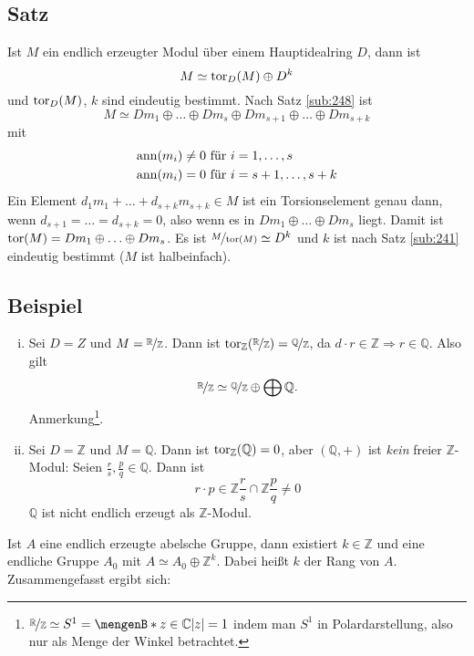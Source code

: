 \subsection[Satz: Zerlegung eines endlich erzeugten Moduls in Torsionsmodul und freien Modul]{Satz} %
\label{sub:251}
Ist $M$ ein endlich erzeugter Modul über einem Hauptidealring $D$, dann ist 
\[
	M \simeq \tor_D(M) \oplus D^k
\]
und $\tor_D(M)$, $k$ sind eindeutig bestimmt.
Nach Satz \ref{sub:248} ist 
\[
	M \simeq D m_1 \oplus \ldots \oplus D m_s \oplus D m_{s+1} \oplus \ldots \oplus D m_{s+k}
\]
mit 
\begin{align*}
	\ann(m_i) &\not= 0 \text{ für }i=1, \ldots ,s \\
	\ann(m_i) &= 0 \text{ für } i=s+1, \ldots , s+k
\end{align*}
Ein Element $d_1 m_1 + \ldots  + d_{s+k} m_{s+k} \in M$ ist ein Torsionselement
genau dann, wenn $d_{s+1} = \ldots = d_{s+k}=0$, also wenn es in $Dm_1\oplus \ldots \oplus D m_s$ liegt. Damit ist $\tor(M)= D m_1 \oplus \ldots \oplus D m_s$.
Es ist $\nicefrac{M}{\tor(M)} \simeq D^k$ und $k$ ist nach Satz \ref{sub:241} eindeutig bestimmt ($M$ ist halbeinfach).\bewende

\subsection[Beispiele für Zerlegungen mit dem Torsionsmodul]{Beispiel} %
\label{sub:252}
\begin{enumerate}[(i)]
	\item Sei $D=Z$ und $M= \nicefrac{\mathds{R}}{\mathds{Z}}$. Dann ist 
	\(
		\tor_\mathds{Z}(\nicefrac{\mathds{R}}{\mathds{Z}}) = \nicefrac{\mathds{Q}}{\mathds{Z}}
	\), da $d \cdot r \in \mathds{Z} \Rightarrow r \in \mathds{Q}$. Also gilt
	\[
		\nicefrac{\mathds{R}}{\mathds{Z}} \simeq \nicefrac{\mathds{Q}}{\mathds{Z}} \oplus \bigoplus \mathds{Q}.
	\]
	Anmerkung\footnote{$\nicefrac{\mathds{R}}{\mathds{Z}}\simeq S^1 = \set[z \in \mathds{C}]{\abs*{z}=1}$ indem man $S^1$ in Polardarstellung, also nur als Menge der Winkel 
	betrachtet.}.
	\item Sei $D=\mathds{Z}$ und $M=\mathds{Q}$. Dann ist $\tor_\mathds{Z}(\mathds{Q})= 0$, aber $(\mathds{Q},+)$ ist \emph{kein} freier $\mathds{Z}$-Modul: Seien 
	$\frac{r}{s}, \frac{p}{q} \in \mathds{Q}$. Dann ist 
	\[
		r \cdot p \in \mathds{Z} \frac{r}{s} \cap \mathds{Z} \frac{p}{q} \not= 0 
	\]
	$\mathds{Q}$ ist nicht endlich erzeugt als $\mathds{Z}$-Modul.
\end{enumerate}
Ist $A$ eine endlich erzeugte abelsche Gruppe, dann existiert $k \in \mathds{Z}$ und eine endliche Gruppe $A_0$ mit $A \simeq A_0 \oplus \mathds{Z}^k$. Dabei heißt $k$ der
Rang von $A$. Zusammengefasst ergibt sich:

